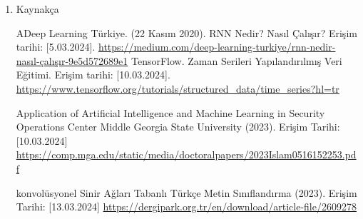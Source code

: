 \documentclass[12pt,a4paper]{article}
\begin{document}
\begin{enumerate}
\begin{itemize}
    \subsection{ GANTT Chart ve İş Akış Planı}
    İş akış şeması, zaman aralıkları ve yapılacak görevler henüz kesinleştirilmemiştir. Gelecek 2 hafta içerisinde iş akış planı, zaman aralıkları ve yapılacak görevlerin tanımları netleştirilecektir. Bu süre zarfında yapılan değişiklikler ilgili haftada bildirilecek ve nihai sonuçlar gelecek 2 hafta içinde sunulacaktır. Şekil 1'de görüldüğü gibi, GANTT Chart iş paketlerinin tanımını ve zaman çizelgesini göstermektedir.
\end{itemize}
  
  \begin{figure}[h]
  	\caption{GANTT CHART}
  	\vspace{1cm} %
  	\centering
  	 \texttt{[image: 789465.png]}
  	\label{gantt}
  		\vspace{1cm} %
  	Şekil \ref{gantt}'de görebileceği üzere
  	iş akış planı gösterilmektedir.
  \end{figure}
  \begin{itemize}
        
      
  \end{itemize}
  \item Kaynakça

  \begin{itemize}
   ADeep Learning Türkiye. (22 Kasım 2020). RNN Nedir? Nasıl Çalışır? Erişim tarihi: [5.03.2024].
  \url{  https://medium.com/deep-learning-turkiye/rnn-nedir-nasıl-çalışır-9e5d572689e1}
   TensorFlow. Zaman Serileri Yapılandırılmış Veri Eğitimi. Erişim tarihi: [10.03.2024]. \newline\url{https://www.tensorflow.org/tutorials/structured_data/time_series?hl=tr}
  
 Application of Artificial Intelligence and Machine Learning in Security Operations Center Middle Georgia State University (2023). Erişim Tarihi:
[10.03.2024]\newline 
\url{ https://comp.mga.edu/static/media/doctoralpapers/2023Islam0516152253.pdf}  
  
   konvolüsyonel Sinir Ağları Tabanlı Türkçe Metin Sınıflandırma (2023). Erişim Tarihi: [13.03.2024] \newline  \url{ https://dergipark.org.tr/en/download/article-file/2609278}


\end{itemize}
\end{enumerate}
\end{document}
